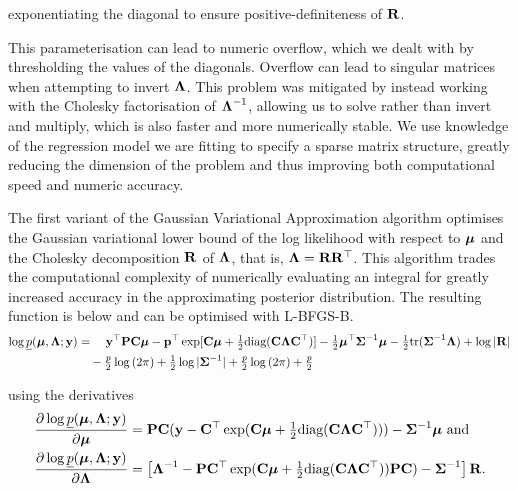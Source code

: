 \documentclass{article}[12pt]
\begin{document}
	\noindent exponentiating the diagonal to ensure positive-definiteness of ${\bf R}$.
	
	\noindent This parameterisation can lead to numeric overflow, which we dealt with by thresholding the values
	of the diagonals. Overflow can lead to singular matrices when attempting to invert ${\boldsymbol \Lambda}$. This problem
	was mitigated by  instead working with the Cholesky factorisation of ${\boldsymbol \Lambda}^{-1}$, allowing us to solve
	rather than invert and multiply, which is also faster and more numerically stable. We use knowledge of the
	regression model we are fitting to specify a sparse matrix structure, greatly reducing the dimension of the
	problem and thus improving both computational speed and numeric accuracy.
	
	The first variant of the Gaussian Variational Approximation algorithm optimises the Gaussian variational lower
	bound of the log likelihood with respect to ${\boldsymbol \mu}$ and the Cholesky decomposition ${\bf R}$ of ${\boldsymbol \Lambda}$, that
	is, ${\boldsymbol \Lambda} = {\bf R} {\bf R}^\top$. This algorithm trades the computational complexity of numerically evaluating an
	integral for greatly increased accuracy in the approximating posterior distribution. The resulting function is
	below and can be optimised with L-BFGS-B.
	\begin{align*}
		\log \underline{p}({\boldsymbol \mu}, {\boldsymbol \Lambda}; {\bf y}) & = \quad {\bf y}^\top{\bf P} {\bf C} {\boldsymbol\mu} - {\bf p}^\top \exp[{\bf C} {\boldsymbol \mu} + \tfrac{1}{2} \text{diag}({\bf C} {\boldsymbol \Lambda} {\bf C}^\top)] - \tfrac{1}{2} {\boldsymbol \mu}^\top {\boldsymbol\Sigma}^{-1} {\boldsymbol \mu} - \tfrac{1}{2} \text{tr}{({\boldsymbol\Sigma}^{-1} {\boldsymbol\Lambda})} + \log{|{\bf R}|} \\
		                                        & \quad - \tfrac{p}{2} \log{(2 \pi)} + \tfrac{1}{2} \log{|{\boldsymbol\Sigma}^{-1}|} + \tfrac{p}{2} \log{(2 \pi)} + \tfrac{p}{2}                                                                              \\
	\end{align*}
	
	using the derivatives
	\begin{align*}
		\frac{\partial \log \underline{p}({\boldsymbol \mu}, {\boldsymbol \Lambda}; {\bf y})}{\partial {\boldsymbol\mu}}     & = {\bf P} {\bf C} ({\bf y} - {\bf C}^\top \exp({\bf C} {\boldsymbol \mu} + \tfrac{1}{2} \text{diag}{({\bf C}{\boldsymbol\Lambda}{\bf C}^\top)})) - {\boldsymbol \Sigma}^{-1} {\boldsymbol \mu} \text{ and}                \\
		\frac{\partial \log \underline{p}({\boldsymbol \mu}, {\boldsymbol \Lambda}; {\bf y})}{\partial {\boldsymbol\Lambda}} & = \left [{\boldsymbol \Lambda}^{-1} - {\bf P} {\bf C}^\top \exp({\bf C} {\boldsymbol \mu} + \tfrac{1}{2} \text{diag}({\bf C} {\boldsymbol \Lambda} {\bf C}^\top)) {\bf P} {\bf C}) - {\boldsymbol \Sigma}^{-1} \right ] {\bf R}. 
	\end{align*}
	
\end{document}

